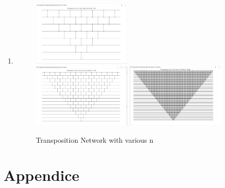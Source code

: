 \documentclass[12pt,a4paper]{article}
\makeatletter
\newtheorem*{solution}{Solution}
\theoremstyle{definition}
\renewenvironment{solution}[1][Solution] {\par\pushQED{\qed}\normalfont\topsep6\p@\@plus6\p@\relax\trivlist\item[\hskip\labelsep\bfseries#1\@addpunct{.}]\ignorespaces}{\popQED\endtrivlist\@endpefalse} \makeatother
\makeatother
\begin{document}
\begin{enumerate}
\begin{solution}
\begin{enumerate}
\begin{figure}
        \includegraphics[width=0.45\textwidth]{n=8.png}
        \\
        \includegraphics[width=0.45\textwidth]{n=16.png}
        \includegraphics[width=0.45\textwidth]{n=64.png}
        \caption{Transposition Network with various n}
        \label{fig:my_label1}
    \end{figure}
\end{enumerate}

\end{solution}
\end{enumerate}
\clearpage
\appendix
\section{Appendice}
\end{document}
